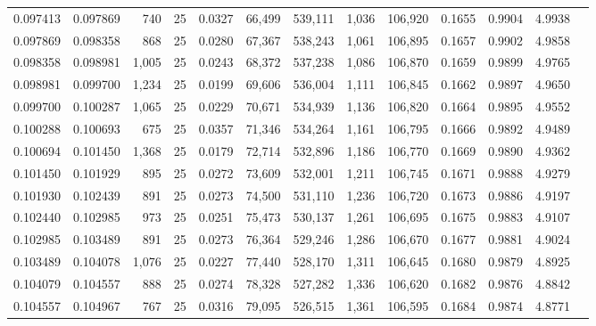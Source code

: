 \begin{tabular}{rrrrrrrrrrrrr}
0.097413 & 0.097869 &   740 &  25 &                                     0.0327 &  66,499 & 539,111 &   1,036 & 106,920 & 0.1655 & 0.9904 & 4.9938 \\
0.097869 & 0.098358 &   868 &  25 &                                     0.0280 &  67,367 & 538,243 &   1,061 & 106,895 & 0.1657 & 0.9902 & 4.9858 \\
0.098358 & 0.098981 & 1,005 &  25 &                                     0.0243 &  68,372 & 537,238 &   1,086 & 106,870 & 0.1659 & 0.9899 & 4.9765 \\
0.098981 & 0.099700 & 1,234 &  25 &                                     0.0199 &  69,606 & 536,004 &   1,111 & 106,845 & 0.1662 & 0.9897 & 4.9650 \\
0.099700 & 0.100287 & 1,065 &  25 &                                     0.0229 &  70,671 & 534,939 &   1,136 & 106,820 & 0.1664 & 0.9895 & 4.9552 \\
0.100288 & 0.100693 &   675 &  25 &                                     0.0357 &  71,346 & 534,264 &   1,161 & 106,795 & 0.1666 & 0.9892 & 4.9489 \\
0.100694 & 0.101450 & 1,368 &  25 &                                     0.0179 &  72,714 & 532,896 &   1,186 & 106,770 & 0.1669 & 0.9890 & 4.9362 \\
0.101450 & 0.101929 &   895 &  25 &                                     0.0272 &  73,609 & 532,001 &   1,211 & 106,745 & 0.1671 & 0.9888 & 4.9279 \\
0.101930 & 0.102439 &   891 &  25 &                                     0.0273 &  74,500 & 531,110 &   1,236 & 106,720 & 0.1673 & 0.9886 & 4.9197 \\
0.102440 & 0.102985 &   973 &  25 &                                     0.0251 &  75,473 & 530,137 &   1,261 & 106,695 & 0.1675 & 0.9883 & 4.9107 \\
0.102985 & 0.103489 &   891 &  25 &                                     0.0273 &  76,364 & 529,246 &   1,286 & 106,670 & 0.1677 & 0.9881 & 4.9024 \\
0.103489 & 0.104078 & 1,076 &  25 &                                     0.0227 &  77,440 & 528,170 &   1,311 & 106,645 & 0.1680 & 0.9879 & 4.8925 \\
0.104079 & 0.104557 &   888 &  25 &                                     0.0274 &  78,328 & 527,282 &   1,336 & 106,620 & 0.1682 & 0.9876 & 4.8842 \\
0.104557 & 0.104967 &   767 &  25 &                                     0.0316 &  79,095 & 526,515 &   1,361 & 106,595 & 0.1684 & 0.9874 & 4.8771 \\

\end{tabular}
